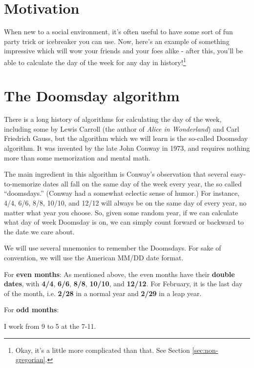 \documentclass[12pt,letterpaper]{article}
\begin{document}
\section{Motivation}

When new to a social environment, it's often useful to have some sort of fun party trick or icebreaker you can use. Now, here's an example of something impressive which will wow your friends and your foes alike - after this, you'll be able to calculate the day of the week for any day in history!\footnote{Okay, it's a little more complicated than that. See Section \ref{sec:non-gregorian}.}

\section{The Doomsday algorithm}

There is a long history of algorithms for calculating the day of the week, including some by Lewis Carroll (the author of \textit{Alice in Wonderland}) and Carl Friedrich Gauss, but the algorithm which we will learn is the so-called Doomsday algorithm. It was invented by the late John Conway in 1973, and requires nothing more than some memorization and mental math. 

The main ingredient in this algorithm is Conway's observation that several easy-to-memorize dates all fall on the same day of the week every year, the so called ``doomsdays.'' (Conway had a somewhat eclectic sense of humor.) For instance, 4/4, 6/6, 8/8, 10/10, and 12/12 will always be on the same day of every year, no matter what year you choose. So, given some random year, if we can calculate what day of week Doomsday is on, we can simply count forward or backward to the date we care about. 

We will use several mnemonics to remember the Doomsdays. For sake of convention, we will use the American MM/DD date format. 

For \textbf{even months}: As mentioned above, the even months have their \textbf{double dates}, with \textbf{4/4}, \textbf{6/6}, \textbf{8/8}, \textbf{10/10}, and \textbf{12/12}. For February, it is the last day of the month, i.e. \textbf{2/28} in a normal year and \textbf{2/29} in a leap year. 

For \textbf{odd months}: 

\begin{displayquote}
	I work from 9 to 5 at the 7-11. 
\end{displayquote}
\end{document}
